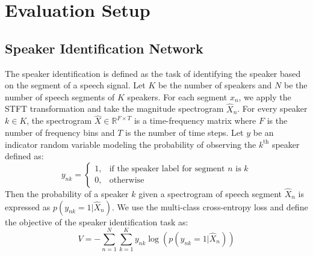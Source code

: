 \section{Evaluation Setup}
\label{sec:eval_setup}
\subsection{Speaker Identification Network}
\label{subsec:sdn}
The speaker identification is defined as the task of identifying the speaker based on the segment of a speech signal. Let $K$ be the number of speakers and $N$ be the number of speech segments of $K$ speakers. For each segment $x_n$, we apply the STFT transformation and take the magnitude spectrogram $\hat{X}_n$. For every speaker $k\in K$, the spectrogram $\hat{X}\in \mathbb{R}^{F\times T}$ is a time-frequency matrix where $F$ is the number of frequency bins and $T$ is the number of time steps. Let $y$ be an indicator random variable modeling the probability of observing the $k^\text{th}$ speaker defined as:
\[
    \label{eq:indicator}
     y_{nk} = 
    \begin{cases}
   1,& \text{if the speaker label for segment $n$ is $k$}\\
    0,              & \text{otherwise}
\end{cases}
\]
Then the probability of a speaker $k$ given a spectrogram of speech segment $\hat{X}_n$ is expressed as $p(y_{nk}=1|\hat{X}_n)$. We use the multi-class cross-entropy loss and define the objective of the speaker identification task as:
\begin{equation}
    \label{eq:ll_spk}
    V = - \sum_{n=1}^N \sum_{k=1}^K y_{nk} \log (p(y_{nk}=1| \hat{X}_n))
\end{equation}

